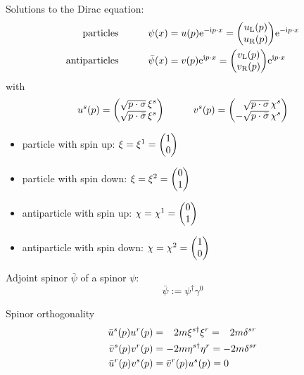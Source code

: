 			\noindent
			Solutions to the Dirac equation:
			\begin{equation}
				\begin{aligned}
					\text{particles} & \hsp
					\psi(x) = u(p) \ex^{-\i p \cdot x} = \mqty(
						u_\text{L}(p) \\
						u_\text{R}(p)
						) \ex^{-\i p \cdot x} \\
					\text{antiparticles} & \hsp
					\bar{\psi}(x) = v(p) \ex^{\i p \cdot x} = \mqty(
						v_\text{L}(p) \\
						v_\text{R}(p)
						) \ex^{\i p \cdot x}
				\end{aligned}
			\end{equation}
			with
			\begin{equation}
				u^s(p) = \mqty(
					\sqrt{p\cdot\sigma}\,\xi^s \\
					\sqrt{p\cdot\bar{\sigma}}\,\xi^s
					)
				\hsp v^s(p) = \mqty(
					\M\sqrt{p\cdot\sigma}\,\chi^s \\
					-\sqrt{p\cdot\bar{\sigma}}\,\chi^s
				)
			\end{equation}
			\begin{itemize}
				\item particle with spin up: $\xi=\xi^1=\mqty(1\\0)$
				\item particle with spin down: $\xi=\xi^2=\mqty(0\\1)$
				\item antiparticle with spin up: $\chi=\chi^1=\mqty(0\\1)$
				\item antiparticle with spin down: $\chi=\chi^2=\mqty(1\\0)$
			\end{itemize}

			\noindent
			Adjoint spinor $\bar{\psi}$ of a spinor $\psi$:
			\begin{equation}
				\bar{\psi} := \psi^{\dagger} \gamma^0
			\end{equation}

			\noindent
			Spinor orthogonality
			\begin{equation}
				\begin{aligned}
					\bar{u}^s(p) u^r(p) &= \M 2m\xi^{s\dagger}\xi^r = \M 2m\delta^{sr} \\
					\bar{v}^s(p) v^r(p) &= - 2m\eta^{s\dagger}\eta^r = - 2m\delta^{sr} \\
					\bar{u}^r(p) v^s(p) &= \bar{v}^r(p) u^s(p) = 0
				\end{aligned}
			\end{equation}

